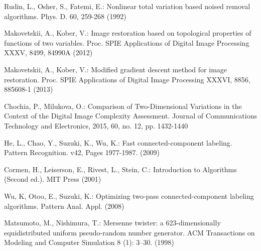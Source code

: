 \documentclass[hidelinks]{llncs}
\begin{document}


\begin{thebibliography}{5}

Rudin, L., Osher, S., Fatemi, E.:
Nonlinear total variation based noised removal algorithms.
Phys. D. 60, 259-268 (1992)


Makovetskii, A., Kober, V.:
Image restoration based on topological properties of functions of two variables.
Proc. SPIE Applications of Digital Image Processing XXXV, 8499, 84990A (2012)

Makovetskii, A., Kober, V.:
Modified gradient descent method for image restoration.
Proc. SPIE Applications of Digital Image Processing XXXVI, 8856, 885608-1 (2013)

Chochia, P., Milukova, O.:
Comparison of Two-Dimensional Variations in the Context of the Digital Image
Complexity Assessment.
Journal of Communications Technology and Electronics, 2015, 60, no. 12,  pp. 1432-1440

He, L., Chao, Y., Suzuki, K., Wu, K.:
Fast connected-component labeling.
Pattern Recognition. v42, Pages 1977-1987. (2009)


Cormen, H., Leiserson, E., Rivest, L., Stein, C.:
Introduction to Algorithms (Second ed.).
MIT Press (2001)

Wu, K, Otoo, E., Suzuki, K.:
Optimizing two-pass connected-component labeling algorithms.
Pattern Anal. Appl. (2008)


Matsumoto, M., Nishimura, T.:
Mersenne twister: a 623-dimensionally equidistributed uniform pseudo-random
number generator.
ACM Transactions on Modeling and Computer Simulation 8 (1): 3–30. (1998)

\end{thebibliography}
\end{document}

